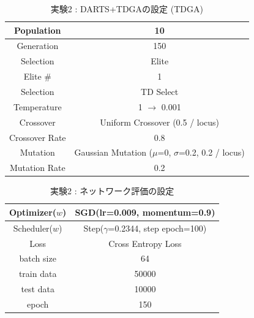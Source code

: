 \begin{table}[t]
  \begin{center}
    \caption{実験2 : DARTS+TDGAの設定 (TDGA)}
  	\vspace{3mm}
    \begin{tabular}{|c|c|} \hline
      Population & 10 \\ \hline
      Generation & 150 \\ \hline \hline
      Selection & Elite \\ \hline
      Elite # & 1 \\ \hline
      Selection & TD Select \\ \hline
      Temperature & 1 $\rightarrow$ 0.001 \\ \hline \hline
      Crossover & Uniform Crossover (0.5 / locus) \\ \hline
      Crossover Rate & 0.8 \\ \hline \hline
      Mutation & Gaussian Mutation ($\mu$=0, $\sigma$=0.2, 0.2 / locus)\\ \hline
      Mutation Rate & 0.2 \\ \hline
    \end{tabular}
    \label{tab:setting_ga}
  \end{center}
\end{table}

\begin{table}[t]
  \begin{center}
    \caption{実験2 : ネットワーク評価の設定}
  	\vspace{3mm}
    \begin{tabular}{|c|c|} \hline
      Optimizer($w$) & SGD(lr=0.009, momentum=0.9) \\ \hline
      Scheduler($w$) & Step($\gamma$=0.2344, step epoch=100) \\ \hline
      Loss & Cross Entropy Loss \\ \hline
      batch size & 64 \\ \hline
      train data & 50000\\ \hline
      test data &  10000\\ \hline
      epoch & 150\\ \hline
    \end{tabular}
    \label{tab:setting_eval}
  \end{center}
\end{table}
